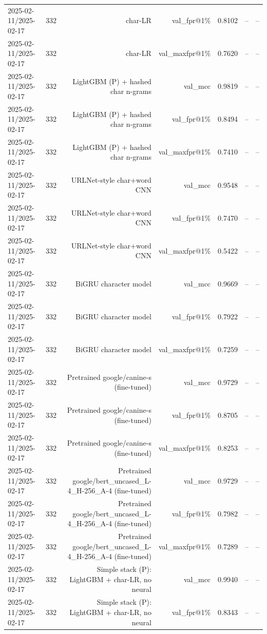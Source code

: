 \begin{table}[t]
\begin{tabular}{llrrrrr}
2025-02-11/2025-02-17 & 332 & char-LR & val\_fpr@1\% & 0.8102 & -- & -- \\
2025-02-11/2025-02-17 & 332 & char-LR & val\_maxfpr@1\% & 0.7620 & -- & -- \\
2025-02-11/2025-02-17 & 332 & LightGBM (P) + hashed char n-grams & val\_mcc & 0.9819 & -- & -- \\
2025-02-11/2025-02-17 & 332 & LightGBM (P) + hashed char n-grams & val\_fpr@1\% & 0.8494 & -- & -- \\
2025-02-11/2025-02-17 & 332 & LightGBM (P) + hashed char n-grams & val\_maxfpr@1\% & 0.7410 & -- & -- \\
2025-02-11/2025-02-17 & 332 & URLNet-style char+word CNN & val\_mcc & 0.9548 & -- & -- \\
2025-02-11/2025-02-17 & 332 & URLNet-style char+word CNN & val\_fpr@1\% & 0.7470 & -- & -- \\
2025-02-11/2025-02-17 & 332 & URLNet-style char+word CNN & val\_maxfpr@1\% & 0.5422 & -- & -- \\
2025-02-11/2025-02-17 & 332 & BiGRU character model & val\_mcc & 0.9669 & -- & -- \\
2025-02-11/2025-02-17 & 332 & BiGRU character model & val\_fpr@1\% & 0.7922 & -- & -- \\
2025-02-11/2025-02-17 & 332 & BiGRU character model & val\_maxfpr@1\% & 0.7259 & -- & -- \\
2025-02-11/2025-02-17 & 332 & Pretrained google/canine-s (fine-tuned) & val\_mcc & 0.9729 & -- & -- \\
2025-02-11/2025-02-17 & 332 & Pretrained google/canine-s (fine-tuned) & val\_fpr@1\% & 0.8705 & -- & -- \\
2025-02-11/2025-02-17 & 332 & Pretrained google/canine-s (fine-tuned) & val\_maxfpr@1\% & 0.8253 & -- & -- \\
2025-02-11/2025-02-17 & 332 & Pretrained google/bert\_uncased\_L-4\_H-256\_A-4 (fine-tuned) & val\_mcc & 0.9729 & -- & -- \\
2025-02-11/2025-02-17 & 332 & Pretrained google/bert\_uncased\_L-4\_H-256\_A-4 (fine-tuned) & val\_fpr@1\% & 0.7982 & -- & -- \\
2025-02-11/2025-02-17 & 332 & Pretrained google/bert\_uncased\_L-4\_H-256\_A-4 (fine-tuned) & val\_maxfpr@1\% & 0.7289 & -- & -- \\
2025-02-11/2025-02-17 & 332 & Simple stack (P): LightGBM + char-LR, no neural & val\_mcc & 0.9940 & -- & -- \\
2025-02-11/2025-02-17 & 332 & Simple stack (P): LightGBM + char-LR, no neural & val\_fpr@1\% & 0.8343 & -- & -- \\

\end{tabular}
\end{table}

